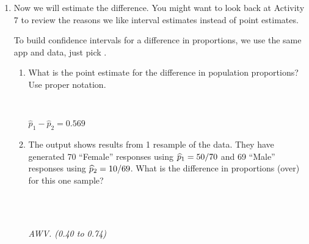 \begin{enumerate}
\begin{enumerate}
\begin{key}
      \\ {\it Reject $H_0$.}\\
\end{key}
       State your conclusion about $H_0$ in the context of this
       situation. Be as specific   as possible about the true
       proportions overestimating their weight.
\begin{students}
 \ \   \vspace*{2cm}\\
\end{students}
\begin{key}
   {\it We conclude that when people are wrong about their weight, a
     much larger proportion of women than men say they are over,
     rather than under weight.}
\end{key}
\end{enumerate}

\item Now we will estimate the difference.  You might want to look
   back at Activity 7 to review the reasons we like interval estimates
   instead of point estimates.

   To build confidence intervals for a difference in proportions, we
   use the same app and data, just pick .

    \begin{enumerate}
      \item    \label{phatDiff} What is the point estimate for the
       difference in population    proportions? Use proper notation.
\begin{students}
 \ \   \vspace*{1cm}\\
\end{students}
\begin{key}
   $\widehat{p}_1  - \widehat{p}_2 =    0.569$
\end{key}

\item The output shows results from 1 resample of the data.
       They have generated  70 ``Female'' responses using $\widehat{p}_1 =
       50/70$ and 69 ``Male'' responses using $\widehat{p}_2 = 10/69$. What
       is the difference in proportions (over) for this one sample?
\begin{students}
 \ \   \vspace*{1cm}\\
\end{students}
\begin{key}
   \\ {\it AWV. (0.40 to 0.74) }  
\end{key}


\end{enumerate}
\end{enumerate}
